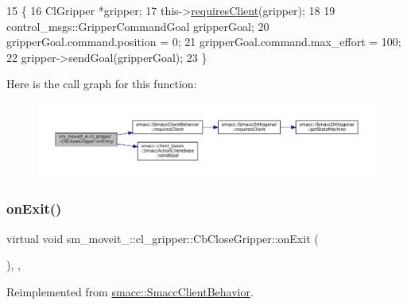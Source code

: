 \begin{DoxyCode}
15     \{
16         ClGripper *gripper;
17         this->\hyperlink{classsmacc_1_1ISmaccClientBehavior_a32b16e99e3b4cb289414203dc861a440}{requiresClient}(gripper);
18 
19         control\_msgs::GripperCommandGoal gripperGoal;
20         gripperGoal.command.position = 0;
21         gripperGoal.command.max\_effort = 100;
22         gripper->sendGoal(gripperGoal);
23     \}
\end{DoxyCode}
Here is the call graph for this function\+:
\nopagebreak
\begin{figure}[H]
\begin{center}
\leavevmode
\includegraphics[width=350pt]{classsm__moveit__4_1_1cl__gripper_1_1CbCloseGripper_ada79ea2869c0297ced61d086bb8def81_cgraph}
\end{center}
\end{figure}
\mbox{\label{classsm__moveit__4_1_1cl__gripper_1_1CbCloseGripper_a9c907d899c60fff004eb9f2d5e29913b}} 
\subsubsection{\texorpdfstring{on\+Exit()}{onExit()}}
{\footnotesize\ttfamily virtual void sm\+\_\+moveit\+\_\+::cl\+\_\+gripper\+::\+Cb\+Close\+Gripper\+::on\+Exit (\begin{DoxyParamCaption}{ }\end{DoxyParamCaption})\hspace{0.3cm}{\ttfamily [inline]}, {\ttfamily [override]}, {\ttfamily [virtual]}}



Reimplemented from \hyperlink{classsmacc_1_1SmaccClientBehavior_a7e4fb6ce81ff96dc172425852d69c0c5}{smacc\+::\+Smacc\+Client\+Behavior}.



